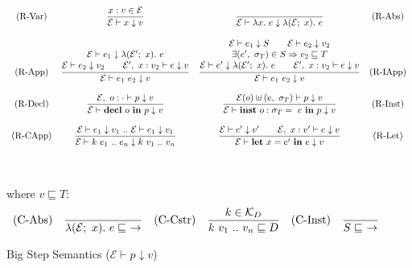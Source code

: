 \documentclass[runningheads]{llncs}
\begin{document}
\begin{figure}$$
  \begin{array}{c c c c} 
    \text{(R-Var)}
    &
    \displaystyle
    \frac{x: v  \in \mathcal{E}}
         {\mathcal{E} \vdash x \downarrow v}
    &
    \displaystyle
    \frac{}
    {\mathcal{E} \vdash \lambda x. \ e \downarrow \lambda (\mathcal{E}; \ x). \ e}
    &
    \text{(R-Abs)}
    \\\\
    \text{(R-App)}
    &
    \displaystyle
    \frac{ \begin{matrix}
      \mathcal{E} \vdash e_1 \downarrow \lambda (\mathcal{E^\prime}; \ x). \ e \\
      \mathcal{E} \vdash e_2 \downarrow v_2 \quad \quad \mathcal{E}^\prime, \ x : v_2 \vdash e \downarrow v
    \end{matrix}}
         {\mathcal{E} \vdash e_1 \ e_2 \downarrow v}
    &
    \displaystyle
    \frac{ \begin{matrix}
      \mathcal{E} \vdash e_1 \downarrow S \quad \quad \mathcal{E} \vdash e_2 \downarrow v_2  \\
      \exists(e^\prime, \ \sigma_T) \in S  \Rightarrow v_2 \sqsubseteq T \\
      \mathcal{E} \vdash e^\prime \downarrow \lambda (\mathcal{E^\prime}; \ x). \ e  \quad \quad \mathcal{E}^\prime, \ x : v_2 \vdash e \downarrow v
    \end{matrix}}
         {\mathcal{E} \vdash e_1 \ e_2 \downarrow v}
    &
    \text{(R-IApp)}
    \\\\
    \text{(R-Decl)}
    &
    \displaystyle
    \frac{\mathcal{E}, \ o : \cdot \vdash p \downarrow v}
         {\mathcal{E} \vdash \textbf{decl} \ o \ \textbf{in} \ p \downarrow v}
    &
    \displaystyle
    \frac{\mathcal{E}(o) \uplus (e, \ \sigma_T) \vdash p \downarrow v}
         {\mathcal{E} \vdash \textbf{inst} \ o : \sigma_T = \ e \ \textbf{in} \ p \downarrow v}
    &
    \text{(R-Inst)}
    \\\\
    \text{(R-CApp)}
    &
    \displaystyle
    \frac{\mathcal{E} \vdash e_1 \downarrow v_1 \ .. \ \mathcal{E} \vdash e_1 \downarrow v_1}
         {\mathcal{E} \vdash k \ e_1 \ .. \ e_n \downarrow k \ v_1 \ .. \ v_n}
    &
    \displaystyle
    \frac{\mathcal{E} \vdash e^\prime \downarrow v^\prime \quad\quad \mathcal{E},\ x : v^\prime \vdash e \downarrow v}
         {\mathcal{E} \vdash \textbf{let} \ x = e^\prime \ \textbf{in} \ e \downarrow v}
    &
    \text{(R-Let)}
  \end{array}$$
  \\\\
  where $v \sqsubseteq T:$
  $$\begin{array}{c c c c c c} 
    \text{(C-Abs)}
    &
    \displaystyle
    \frac{}
         {\lambda (\mathcal{E}; \ x). \ e \sqsubseteq \ \rightarrow}
    &
    \text{(C-Cstr)}
    &
    \displaystyle
    \frac{k \in \mathcal{K}_D}
    {k \ v_1 \ .. \ v_n \sqsubseteq D}
    &
    \text{(C-Inst)}
    &
    \displaystyle
    \frac{}
    {S \sqsubseteq \ \rightarrow}
  \end{array}$$
  \caption{Big Step Semantics ($\mathcal{E} \vdash p \downarrow v$)}
\end{figure}
\end{document}
